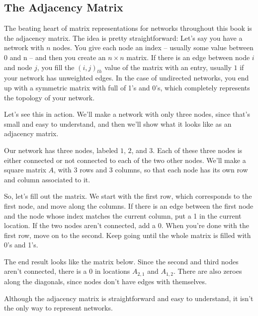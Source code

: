 \documentclass[letterpaper,10pt,english]{jupyterBook}
\begin{document}
\subsection{The Adjacency Matrix}
\label{\detokenize{representations/ch4/matrix-representations:the-adjacency-matrix}}
\sphinxAtStartPar
The beating heart of matrix representations for networks throughout this book is the adjacency matrix. The idea is pretty straightforward: Let’s say you have a network with \(n\) nodes. You give each node an index – usually some value between 0 and n – and then you create an \(n \times n\) matrix. If there is an edge between node \(i\) and node \(j\), you fill the \((i, j)_{th}\) value of the matrix with an entry, usually \(1\) if your network has unweighted edges. In the case of undirected networks, you end up with a symmetric matrix with full of 1’s and 0’s, which completely represents the topology of your network.

\sphinxAtStartPar
Let’s see this in action. We’ll make a network with only three nodes, since that’s small and easy to understand, and then we’ll show what it looks like as an adjacency matrix.

\noindent{}

\sphinxAtStartPar
Our network has three nodes, labeled \(1\), \(2\), and \(3\). Each of these three nodes is either connected or not connected to each of the two other nodes. We’ll make a square matrix \(A\), with 3 rows and 3 columns, so that each node has its own row and column associated to it.

\sphinxAtStartPar
So, let’s fill out the matrix. We start with the first row, which corresponds to the first node, and move along the columns. If there is an edge between the first node and the node whose index matches the current column, put a 1 in the current location. If the two nodes aren’t connected, add a 0. When you’re done with the first row, move on to the second. Keep going until the whole matrix is filled with 0’s and 1’s.

\sphinxAtStartPar
The end result looks like the matrix below. Since the second and third nodes aren’t connected, there is a \(0\) in locations \(A_{2, 1}\) and \(A_{1, 2}\). There are also zeroes along the diagonals, since nodes don’t have edges with themselves.

\noindent{}

\sphinxAtStartPar
Although the adjacency matrix is straightforward and easy to understand, it isn’t the only way to represent networks.
\end{document}

